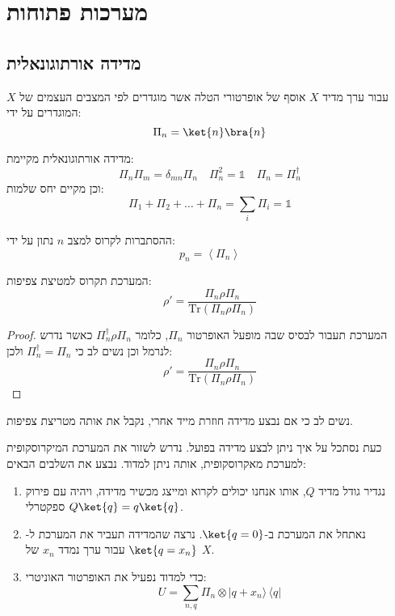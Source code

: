 \documentclass{tstextbook}
\begin{document}
\chapter{מערכות פתוחות}

\section{מדידה אורתוגונאלית}

\begin{definition}
עבור ערך מדיד \(X\) אוסף של אופרטורי הטלה אשר מוגדרים לפי המצבים העצמים של \(X\) המוגדרים על ידי:
$$\Pi_{n}=\ket{n} \bra{n} $$

\end{definition}
\begin{proposition}
מדידה אורתוגונאלית מקיימת:
$$\Pi_{n}\Pi_{m}=\delta_{mn}\Pi_{n}\quad \Pi_{n}^{2}=\mathbb{1} \quad \Pi_{n}=\Pi_{n}^{\dagger}$$
וכן מקיים יחס שלמות:
$$\Pi_{1}+\Pi_{2}+\dots+\Pi_{n}=\sum_{i}\Pi_{i}=\mathbb{1} $$

\end{proposition}
\begin{proposition}
ההסתברות לקרוס למצב \(n\) נתון על ידי:
$$p_{n}=\left\langle  \Pi_{n}  \right\rangle $$

\end{proposition}
\begin{proposition}
המערכת תקרוס למטיצת צפיפות:
$$\rho'= \frac{\Pi_{n}\rho \Pi_{n}}{\mathrm{Tr}\left( \Pi_{n}\rho \Pi_{n} \right)}$$

\end{proposition}
\begin{proof}
המערכת תעבור לבסיס שבה מופעל האופרטור \(\Pi_{n}\), כלומר \(\Pi_{n}^{\dagger}\rho \Pi_{n}\) כאשר נדרש לנרמל וכן נשים לב כי \(\Pi ^{\dagger}_{n}=\Pi_{n}\) ולכן:
$$\rho'= \frac{\Pi_{n}\rho \Pi_{n}}{\mathrm{Tr}\left( \Pi_{n}\rho \Pi_{n} \right)}$$

\end{proof}
\begin{remark}
נשים לב כי אם נבצע מדידה חוזרת מייד אחרי, נקבל את אותה מטריצת צפיפות.

\end{remark}
\begin{proposition}
כעת נסתכל על איך ניתן לבצע מדידה בפועל. נדרש לשזור את המערכת המיקרוסקופית למערכת מאקרוסקופית, אותה ניתן למדוד. נבצע את השלבים הבאים:

  \begin{enumerate}
    \item נגדיר גודל מדיד \(Q\), אותו אנחנו יכולים לקרוא ומייצג מכשיר מדידה, ויהיה עם פירוק ספקטרלי \(Q\ket{q}=q\ket{q}\). 


    \item נאתחל את המערכת ב-\(\ket{q=0}\). נרצה שהמדידה תעביר את המערכת ל-\(\ket{q=x_{n}}\) עבור ערך נמדד \(x_{n}\) של \(X\). 


    \item כדי למדוד נפעיל את האופרטור האוניטרי: 
$$U=\sum_{n,q}\Pi_{n}\otimes|q+x_{n}\rangle\,\langle q|$$


  \end{enumerate}
\end{proposition}
\end{document}
